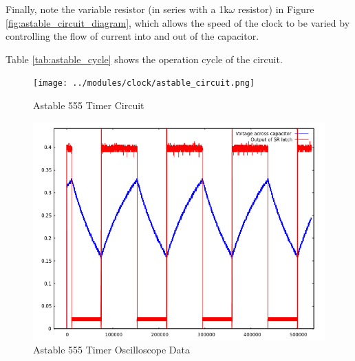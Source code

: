 \documentclass[12pt]{article}
\begin{document}
\begin{FlushLeft}
\vspace{0.3cm}

Finally, note the variable resistor (in series with a 1k$\omega$ resistor) in Figure \ref{fig:astable_circuit_diagram}, which allows the speed of the clock to be varied by controlling the flow of current into and out of the capacitor. \\

\vspace{0.3cm}

Table \ref{tab:astable_cycle} shows the operation cycle of the circuit. \\


\begin{figure}[h]
  \begin{center}
    \texttt{[image: ../modules/clock/astable\_circuit.png]}
    \caption{Astable 555 Timer Circuit}
    \label{fig:astable_circuit}
  \end{center}
\end{figure}

\begin{figure}[h]
  \begin{center}
    \includegraphics[width=\linewidth]{../modules/clock/astable_scope_no_caps.png}
    \caption{Astable 555 Timer Oscilloscope Data}
    \label{fig:astable_scope}
  \end{center}
\end{figure}


\end{FlushLeft}
\end{document}
